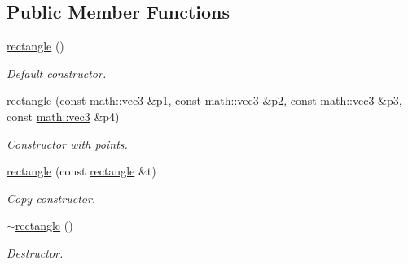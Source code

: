 \subsection*{Public Member Functions}
\begin{DoxyCompactItemize}
\item 
\mbox{\label{classphysim_1_1geometric_1_1rectangle_a56078b6e9053fffb19e5e5d4648f6880}} 
\hyperlink{classphysim_1_1geometric_1_1rectangle_a56078b6e9053fffb19e5e5d4648f6880}{rectangle} ()
\begin{DoxyCompactList}\small\item\em Default constructor. \end{DoxyCompactList}\item 
\hyperlink{classphysim_1_1geometric_1_1rectangle_a19ee9fbc0666035eda867de84a7e7df1}{rectangle} (const \hyperlink{structphysim_1_1math_1_1vec3}{math\+::vec3} \&\hyperlink{classphysim_1_1geometric_1_1rectangle_a7af5009a87211214b1b1ef7ec6316d20}{p1}, const \hyperlink{structphysim_1_1math_1_1vec3}{math\+::vec3} \&\hyperlink{classphysim_1_1geometric_1_1rectangle_ab3107a5faeb3c52420ffe4c074a145be}{p2}, const \hyperlink{structphysim_1_1math_1_1vec3}{math\+::vec3} \&\hyperlink{classphysim_1_1geometric_1_1rectangle_a559ad6301b4da2b82350d36cdfa46f23}{p3}, const \hyperlink{structphysim_1_1math_1_1vec3}{math\+::vec3} \&p4)
\begin{DoxyCompactList}\small\item\em Constructor with points. \end{DoxyCompactList}\item 
\mbox{\label{classphysim_1_1geometric_1_1rectangle_a46a8abaa08eb338dd25c54afe2cb5044}} 
\hyperlink{classphysim_1_1geometric_1_1rectangle_a46a8abaa08eb338dd25c54afe2cb5044}{rectangle} (const \hyperlink{classphysim_1_1geometric_1_1rectangle}{rectangle} \&t)
\begin{DoxyCompactList}\small\item\em Copy constructor. \end{DoxyCompactList}\item 
\mbox{\label{classphysim_1_1geometric_1_1rectangle_a5949e485e660adebf4e2d079185a5722}} 
\hyperlink{classphysim_1_1geometric_1_1rectangle_a5949e485e660adebf4e2d079185a5722}{$\sim$rectangle} ()
\begin{DoxyCompactList}\small\item\em Destructor. \end{DoxyCompactList}\item 

\end{DoxyCompactItemize}
